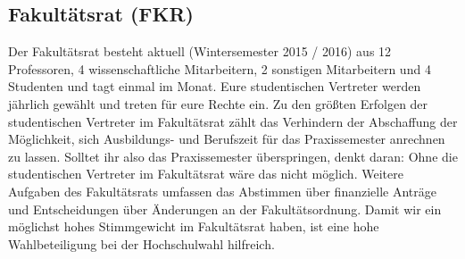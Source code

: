 \subsection{Fakultätsrat (FKR)}
Der Fakultätsrat besteht aktuell (Wintersemester 2015 / 2016) aus 12
Professoren, 4 wissenschaftliche Mitarbeitern, 2 sonstigen Mitarbeitern und 4 Studenten und tagt einmal
im Monat. Eure studentischen Vertreter werden jährlich gewählt und 
treten für eure Rechte ein. \doublebreak
Zu den größten Erfolgen der studentischen Vertreter im Fakultätsrat 
zählt das Verhindern der Abschaffung der Möglichkeit, sich Ausbildungs- und Berufszeit für das Praxissemester anrechnen zu lassen. Solltet ihr also das 
Praxissemester überspringen, denkt daran: Ohne die studentischen 
Vertreter im Fakultätsrat wäre das nicht möglich. Weitere Aufgaben 
des Fakultätsrats umfassen das Abstimmen über finanzielle Anträge 
und Entscheidungen über Änderungen an der Fakultätsordnung. Damit 
wir ein möglichst hohes Stimmgewicht im Fakultätsrat haben, ist eine 
hohe Wahlbeteiligung bei der Hochschulwahl hilfreich. 